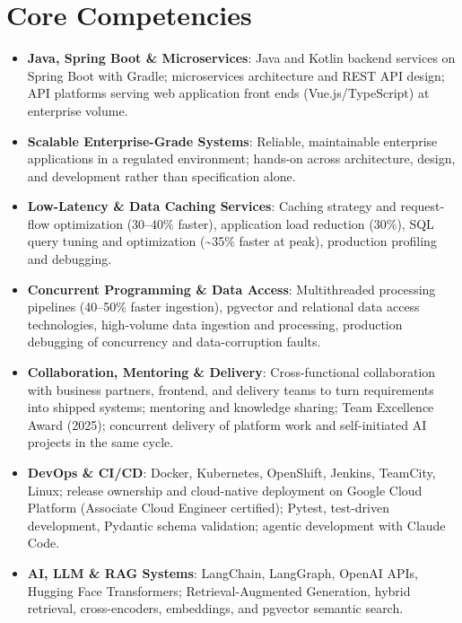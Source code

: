 \documentclass[11pt,a4paper,sans]{moderncv}
\begin{document}
\section{Core Competencies}
\vspace{1pt}
\begin{itemize}

\item \textbf{Java, Spring Boot \& Microservices}: Java and Kotlin backend services on Spring Boot with Gradle; microservices architecture and REST API design; API platforms serving web application front ends (Vue.js/TypeScript) at enterprise volume.

\item \textbf{Scalable Enterprise-Grade Systems}: Reliable, maintainable enterprise applications in a regulated environment; hands-on across architecture, design, and development rather than specification alone.

\item \textbf{Low-Latency \& Data Caching Services}: Caching strategy and request-flow optimization (30--40\% faster), application load reduction (30\%), SQL query tuning and optimization (\textasciitilde35\% faster at peak), production profiling and debugging.

\item \textbf{Concurrent Programming \& Data Access}: Multithreaded processing pipelines (40--50\% faster ingestion), pgvector and relational data access technologies, high-volume data ingestion and processing, production debugging of concurrency and data-corruption faults.

\item \textbf{Collaboration, Mentoring \& Delivery}: Cross-functional collaboration with business partners, frontend, and delivery teams to turn requirements into shipped systems; mentoring and knowledge sharing; Team Excellence Award (2025); concurrent delivery of platform work and self-initiated AI projects in the same cycle.

\item \textbf{DevOps \& CI/CD}: Docker, Kubernetes, OpenShift, Jenkins, TeamCity, Linux; release ownership and cloud-native deployment on Google Cloud Platform (Associate Cloud Engineer certified); Pytest, test-driven development, Pydantic schema validation; agentic development with Claude Code.

\item \textbf{AI, LLM \& RAG Systems}: LangChain, LangGraph, OpenAI APIs, Hugging Face Transformers; Retrieval-Augmented Generation, hybrid retrieval, cross-encoders, embeddings, and pgvector semantic search.

\end{itemize}
\end{document}
